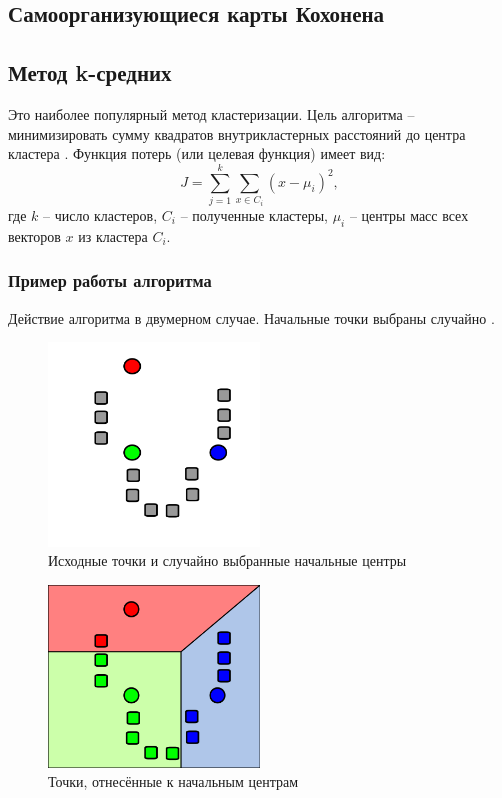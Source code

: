 \documentclass[bachelor, och, referat]{SCWorks}
\begin{document}
\subsection{Самоорганизующиеся карты Кохонена}

\subsection{Метод k-средних}
Это наиболее популярный метод кластеризации. Цель алгоритма -- минимизировать сумму квадратов внутрикластерных расстояний до центра кластера \cite{kmean1}. Функция потерь (или целевая функция) имеет вид:
\[ J = \sum_{j = 1}^{k} \sum_{x \in C_i} (x - \mu_i)^2 , \]
где $k$ -- число кластеров, $C_i$ -- полученные кластеры, $\mu_i$ --
центры масс всех векторов $x$ из кластера $C_i$.

\subsubsection{Пример работы алгоритма}
Действие алгоритма в двумерном случае. Начальные точки выбраны случайно \cite{kmean2}.
\begin{figure}[H]
    \centering
    \includegraphics[width=0.5\textwidth]{1.png}
    \caption{Исходные точки и случайно выбранные начальные центры}
\end{figure}

\begin{figure}[H]
    \centering
    \includegraphics[width=0.5\textwidth]{2.png}
    \caption{Точки, отнесённые к начальным центрам}
\end{figure}
\end{document}
